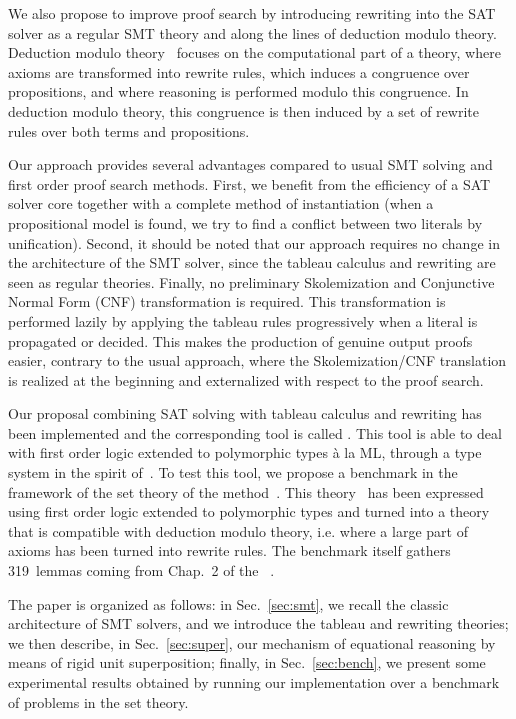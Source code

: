 We also propose to improve proof search by introducing rewriting into the SAT
solver as a regular SMT theory and along the lines of deduction modulo
theory. Deduction modulo theory~\cite{DA03} focuses on the computational part of
a theory, where axioms are transformed into rewrite rules, which induces a
congruence over propositions, and where reasoning is performed modulo this
congruence. In deduction modulo theory, this congruence is then induced by a set
of rewrite rules over both terms and propositions.

Our approach provides several advantages compared to usual SMT solving and first
order proof search methods. First, we benefit from the efficiency of a SAT
solver core together with a complete method of instantiation (when a
propositional model is found, we try to find a conflict between two literals by
unification). Second, it should be noted that our approach requires no change in
the architecture of the SMT solver, since the tableau calculus and rewriting are
seen as regular theories. Finally, no preliminary Skolemization and Conjunctive
Normal Form (CNF) transformation is required. This transformation is performed
lazily by applying the tableau rules progressively when a literal is propagated
or decided. This makes the production of genuine output proofs easier, contrary
to the usual approach, where the Skolemization/CNF translation is realized at
the beginning and externalized with respect to the proof search.

Our proposal combining SAT solving with tableau calculus and rewriting has been
implemented and the corresponding tool is called \archsat{}. This tool is able
to deal with first order logic extended to polymorphic types à la ML, through a
type system in the spirit of~\cite{BP13}. To test this tool, we propose a
benchmark in the framework of the set theory of the \bmth{}
method~\cite{B-Book}. This theory~\cite{BA15} has been expressed using first
order logic extended to polymorphic types and turned into a theory that is
compatible with deduction modulo theory, i.e. where a large part of axioms has
been turned into rewrite rules. The benchmark itself gathers 319~lemmas coming
from Chap.~2 of the \bbook{}~\cite{B-Book}.

The paper is organized as follows: in Sec.~\ref{sec:smt}, we recall the classic
architecture of SMT solvers, and we introduce the tableau and rewriting
theories; we then describe, in Sec.~\ref{sec:super}, our mechanism of equational
reasoning by means of rigid unit superposition; finally, in
Sec.~\ref{sec:bench}, we present some experimental results obtained by running
our implementation over a benchmark of problems in the \bmth{} set theory.

